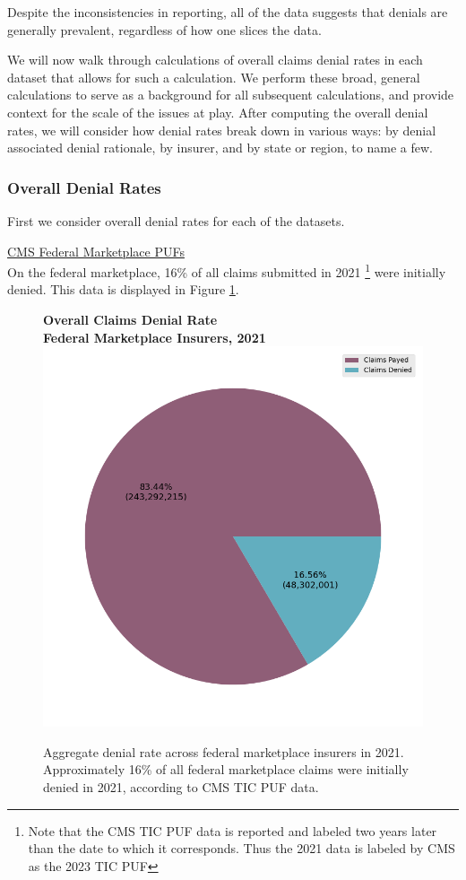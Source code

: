 \documentclass[12pt, a4paper,twoside,parskip=full]{report}
\theoremstyle{plain} %
\theoremstyle{definition} %
\theoremstyle{remark} %
\numberwithin{equation}{chapter}
\begin{document}
		Despite the inconsistencies in reporting, all of the data suggests that denials are generally prevalent, regardless of how one slices the data. 
		
		We will now walk through calculations of overall claims denial rates in each
		dataset that allows for such a calculation. We perform these broad, general calculations 
		to serve as a background for all subsequent calculations, and provide context
		for the scale of the issues at play. After computing the overall denial rates, we
		will consider how denial rates break down in various ways: by denial associated
		denial rationale, by insurer, and by state or region, to name a few.

		
		\subsubsection{Overall Denial Rates}
		
		First we consider overall denial rates for each of the datasets.
		
		\underline{CMS Federal Marketplace PUFs}\\
		
			On the federal marketplace, 16\% of all claims submitted in 2021 \footnote{Note that the CMS TIC PUF data is reported and labeled two years later than the date to which it corresponds. Thus the 2021 data is labeled by CMS as the 2023 TIC PUF} were initially denied. This data is displayed in Figure \ref{federal_denial_rate}.
			
			\begin{figure}[h!]
				\centering
				\textbf{Overall Claims Denial Rate}\\
				\textbf{Federal Marketplace Insurers, 2021}\\
				\includegraphics[width=.6\columnwidth]{images/cms_puf/overall_denial_pie.png}
				\caption{Aggregate denial rate across federal marketplace insurers in 2021. Approximately 16\% of all federal marketplace claims were initially denied in 2021, according to CMS TIC PUF data.}
				\label{federal_denial_rate}
			\end{figure}
		\clearpage
	
\end{document}
